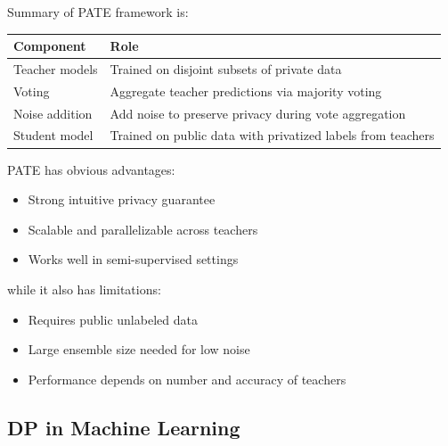 \documentclass[11pt, a4paper]{article}
\begin{document}
Summary of PATE framework is:
\begin{center}
\begin{tabular}{|l|p{10cm}|}
\hline
\textbf{Component} & \textbf{Role} \\
\hline
Teacher models & Trained on disjoint subsets of private data \\
Voting & Aggregate teacher predictions via majority voting \\
Noise addition & Add noise to preserve privacy during vote aggregation \\
Student model & Trained on public data with privatized labels from teachers \\
\hline
\end{tabular}
\end{center}

PATE has obvious advantages:
\begin{itemize}
    \item Strong intuitive privacy guarantee
    \item Scalable and parallelizable across teachers
    \item Works well in semi-supervised settings
\end{itemize}
while it also has limitations:
\begin{itemize}
    \item Requires public unlabeled data
    \item Large ensemble size needed for low noise
    \item Performance depends on number and accuracy of teachers
\end{itemize}


\subsection{DP in Machine Learning}
\end{document}
